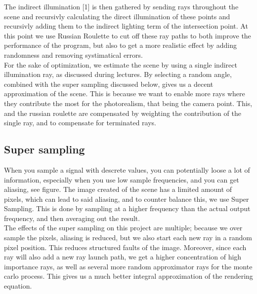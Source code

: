 \documentclass[12pt]{article}
\numberwithin{equation}{section}
\begin{document}
The indirect illumination [1] is then gathered by sending rays throughout the scene and recursivly calculating the direct illumination of these points and recursivly adding them to the indirect lighting term of the intersection point. At this point we use Russian Roulette to cut off these ray paths to both improve the performance of the program, but also to get a more realistic effect by adding randomness and removing systimatical errors.\\

For the sake of optimization, we estimate the scene by using a single indirect illumination ray, as discussed during lectures. By selecting a random angle, combined with the super sampling discussed below, gives us a decent approximation of the scene. This is because we want to enable more rays where they contribute the most for the photorealism, that being the camera point. This, and the russian roulette are compensated by weighting the contribution of the single ray, and to compensate for terminated rays.


\subsection{Super sampling}

When you sample a signal with descrete values, you can potentially loose a lot of information, especially when you use low sample frequencies, and you can get aliasing, see figure. The image created of the scene has a limited amount of pixels, which can lead to said aliasing, and to counter balance this, we use Super Sampling. This is done by sampling at a higher frequency than the actual output frequency, and then averaging out the result.\\ 

The effects of the super sampling on this project are multiple; because we over sample the pixels, aliasing is reduced, but we also start each new ray in a random pixel position. This reduces structured faults of the image. Moreover, since each ray will also add a new ray launch path, we get a higher concentration of high importance rays, as well as several more random approximator rays for the monte carlo process. This gives us a much better integral approximation of the rendering equation.
\end{document}
